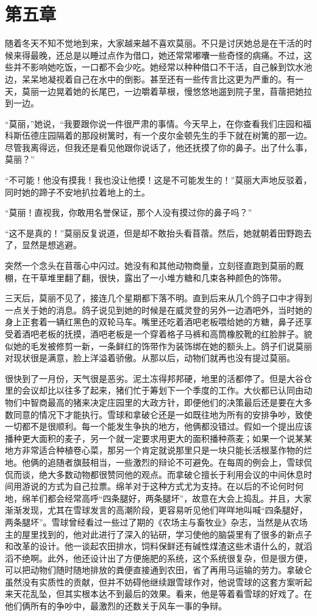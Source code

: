 \chapter{第五章}

随着冬天不知不觉地到来，大家越来越不喜欢莫丽。不只是讨厌她总是在干活的时候来得最晚，还总是以睡过点作为借口，她还常常嘟囔一些奇怪的病痛。不过，这些并不影响她吃饭，一口都不会少吃。她经常以种种借口不干活，自己躲到饮水池边，呆呆地凝视着自己在水中的倒影。甚至还有一些传言比这更为严重的。有一天，莫丽一边晃着她的长尾巴，一边嚼着草根，慢悠悠地遛到院子里，苜蓿把她拉到一边。

“莫丽，”她说，“我要跟你说一件很严肃的事情。今天早上，在你查看我们庄园和福科斯伍德庄园隔着的那段树篱时，有一个皮尔金顿先生的手下就在树篱的那一边。尽管我离得远，但我还是看见他跟你说话了，他还抚摸了你的鼻子。出了什么事，莫丽？”

“不可能！他没有摸我！我也没让他摸！这是不可能发生的！”莫丽大声地反驳着，同时她的蹄子不安地扒拉着地上的土。

“莫丽！直视我，你敢用名誉保证，那个人没有摸过你的鼻子吗？”

“这不是真的！”莫丽反复说道，但是却不敢抬头看苜蓿。然后，她就朝着田野跑去了，显然是想逃避。

突然一个念头在苜蓿心中闪过。她没有和其他动物商量，立刻径直跑到莫丽的厩棚，在干草堆里翻了翻，很快，露出了一小堆方糖和几束各种颜色的饰带。

三天后，莫丽不见了，接连几个星期都下落不明。直到后来从几个鸽子口中才得到一点关于她的消息。鸽子说见到她的时候是在威灵登的另外一边酒吧外，当时她的身上正套着一辆红黑色的双轮马车。嘴里还吃着酒吧老板喂给她的方糖，鼻子还享受着酒吧老板的抚摸，酒吧老板是一个穿着格子马裤和高筒橡胶靴的红脸胖子。貌似她的毛发被修剪一新，一条鲜红的饰带作为装饰绑在她的额头上。鸽子们说莫丽对现状很是满意，脸上洋溢着骄傲。从那以后，动物们就再也没有提过莫丽。

很快到了一月份，天气很是恶劣。泥土冻得邦邦硬，地里的活都停了。但是大谷仓里的会议却比以往多了起来，猪们忙于筹划下一个季度的工作。大伙都已认同由动物们中智商最高的猪来决定庄园里的大政方针，即便他们的决策最后还是要在大多数同意的情况下才能执行。雪球和拿破仑还是一如既往地为所有的安排争吵，致使一切都不是很顺利。每一个能发生争执的地方，他俩都没错过。假如一个提出应该播种更大面积的麦子，另一个就一定要求用更大的面积播种燕麦；如果一个说某某地方非常适合种植卷心菜，那另一个肯定就说那里只是一块只能长活根茎作物的烂地。他俩的追随者旗鼓相当，一些激烈的辩论不可避免。在每周的例会上，雪球侃侃而谈，绝大多数动物都很赞同他的观点。而拿破仑擅长于利用会议的中间休息时间用游说的方式为自己拉票。绵羊对于这种方式尤为支持。在以后的不论何时何地，绵羊们都会经常高呼“四条腿好，两条腿坏”，故意在大会上捣乱。并且，大家渐渐发现，尤其在雪球发言的高潮阶段，更容易听见他们咩咩地叫喊“四条腿好，两条腿坏”。雪球曾经看过一些过了期的《农场主与畜牧业》杂志，当然是从农场主的屋里找到的，他对此进行了深入的钻研，学习使他的脑袋里有了很多的新点子和改革的设计。他一谈起农田排水，饲料保鲜还有碱性煤渣这些术语什么的，就滔滔不绝啊。此外，他还设计出了方便施肥的系统，这个系统很复杂，但是很方便，可以把动物们随时随地排放的粪便直接通到农田，省了再用马运输的劳力。拿破仑虽然没有实质性的贡献，但并不妨碍他继续跟雪球作对，他说雪球的这套方案听起来天花乱坠，但其实根本达不到最后的效果。看来，他是等着看雪球的好戏了。在他们俩所有的争吵中，最激烈的还数关于风车一事的争辩。

